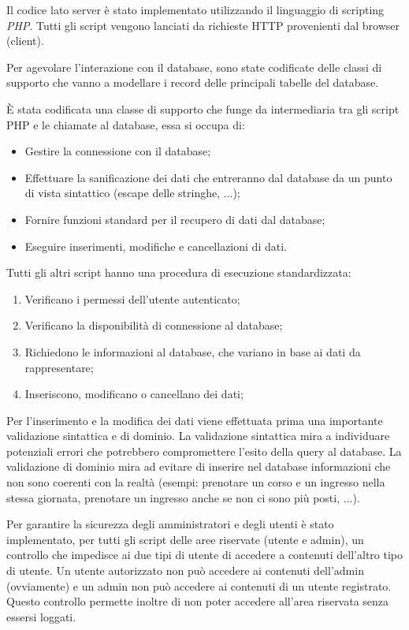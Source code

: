Il codice lato server è stato implementato utilizzando il linguaggio di scripting \textit{PHP}. Tutti gli script vengono lanciati da richieste HTTP provenienti dal browser (client).

Per agevolare l'interazione con il database, sono state codificate delle classi di supporto che vanno a modellare i record delle principali tabelle del database. 

È stata codificata una classe di supporto che funge da intermediaria tra gli script PHP e le chiamate al database, essa si occupa di:
\begin{itemize}
\item Gestire la connessione con il database;
\item Effettuare la sanificazione dei dati che entreranno dal database da un punto di vista sintattico (escape delle stringhe, ...);
\item Fornire funzioni standard per il recupero di dati dal database;
\item Eseguire inserimenti, modifiche e cancellazioni di dati.
\end{itemize}

Tutti gli altri script hanno una procedura di esecuzione standardizzata:
\begin{enumerate}
\item Verificano i permessi dell'utente autenticato;
\item Verificano la disponibilità di connessione al database;
\item Richiedono le informazioni al database, che variano in base ai dati da rappresentare;
\item Inseriscono, modificano o cancellano dei dati;
\end{enumerate}

Per l'inserimento e la modifica dei dati viene effettuata prima una importante validazione sintattica e di dominio. La validazione sintattica mira a individuare potenziali errori che potrebbero compromettere l'esito della query al database. La validazione di dominio mira ad evitare di inserire nel database informazioni che non sono coerenti con la realtà (esempi: prenotare un corso e un ingresso nella stessa giornata, prenotare un ingresso anche se non ci sono più posti, ...).

Per garantire la sicurezza degli amministratori e degli utenti è stato implementato, per tutti gli script delle aree riservate (utente e admin), un controllo che impedisce ai due tipi di utente di accedere a contenuti dell'altro tipo di utente. Un utente autorizzato non può accedere ai contenuti dell'admin (ovviamente) e un admin non può accedere ai contenuti di un utente registrato. Questo controllo permette inoltre di non poter accedere all'area riservata senza essersi loggati.
